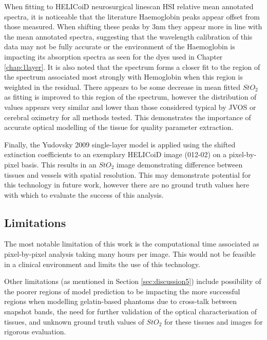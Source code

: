 When fitting to HELICoiD neurosurgical linescan HSI relative mean annotated spectra, it is noticeable that the literature Haemoglobin peaks appear offset from those measured. When shifting these peaks by 3nm they appear more in line with the mean annotated spectra, suggesting that the wavelength calibration of this data may not be fully accurate or the environment of the Haemoglobin is impacting its absorption spectra as seen for the dyes used in Chapter \ref{chap:1layer}. It is also noted that the spectrum forms a closer fit to the region of the spectrum associated most strongly with Hemoglobin when this region is weighted in the residual. There appears to be some decrease in mean fitted $StO_2$ as fitting is improved to this region of the spectrum, however the distribution of values appears very similar and lower than those considered typical by JVOS or cerebral oximetry for all methods tested. This demonstrates the importance of accurate optical modelling of the tissue for quality parameter extraction. 

Finally, the Yudovsky 2009 single-layer model is applied using the shifted extinction coefficients to an exemplary HELICoiD image (012-02) on a pixel-by-pixel basis. This results in an $StO_2$ image demonstrating difference between tissues and vessels with spatial resolution. This may demonstrate potential for this technology in future work, however there are no ground truth values here with which to evaluate the success of this analysis.

\subsection{Limitations}
The most notable limitation of this work is the computational time associated as pixel-by-pixel analysis taking many hours per image. This would not be feasible in a clinical environment and limits the use of this technology. 

Other limitations (as mentioned in Section \ref{sec:discussion5}) include possibility of the poorer regions of model prediction to be impacting the more successful regions when modelling gelatin-based phantoms due to cross-talk between snapshot bands, the need for further validation of the optical characterisation of tissues, and unknown ground truth values of $StO_2$ for these tissues and images for rigorous evaluation. 

